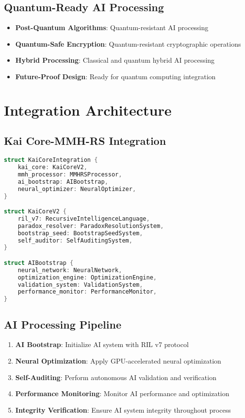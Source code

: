 \documentclass[12pt,a4paper]{article}
\begin{document}
\subsection{Quantum-Ready AI Processing}
\begin{itemize}
    \item \textbf{Post-Quantum Algorithms}: Quantum-resistant AI processing
    \item \textbf{Quantum-Safe Encryption}: Quantum-resistant cryptographic operations
    \item \textbf{Hybrid Processing}: Classical and quantum hybrid AI processing
    \item \textbf{Future-Proof Design}: Ready for quantum computing integration
\end{itemize}

\section{Integration Architecture}

\subsection{Kai Core-MMH-RS Integration}
\begin{lstlisting}[language=Rust, caption=Kai Core Integration Architecture]
struct KaiCoreIntegration {
    kai_core: KaiCoreV2,
    mmh_processor: MMHRSProcessor,
    ai_bootstrap: AIBootstrap,
    neural_optimizer: NeuralOptimizer,
}

struct KaiCoreV2 {
    ril_v7: RecursiveIntelligenceLanguage,
    paradox_resolver: ParadoxResolutionSystem,
    bootstrap_seed: BootstrapSeedSystem,
    self_auditor: SelfAuditingSystem,
}

struct AIBootstrap {
    neural_network: NeuralNetwork,
    optimization_engine: OptimizationEngine,
    validation_system: ValidationSystem,
    performance_monitor: PerformanceMonitor,
}
\end{lstlisting}

\subsection{AI Processing Pipeline}
\begin{enumerate}
    \item \textbf{AI Bootstrap}: Initialize AI system with RIL v7 protocol
    \item \textbf{Neural Optimization}: Apply GPU-accelerated neural optimization
    \item \textbf{Self-Auditing}: Perform autonomous AI validation and verification
    \item \textbf{Performance Monitoring}: Monitor AI performance and optimization
    \item \textbf{Integrity Verification}: Ensure AI system integrity throughout process
\end{enumerate}
\end{document}

